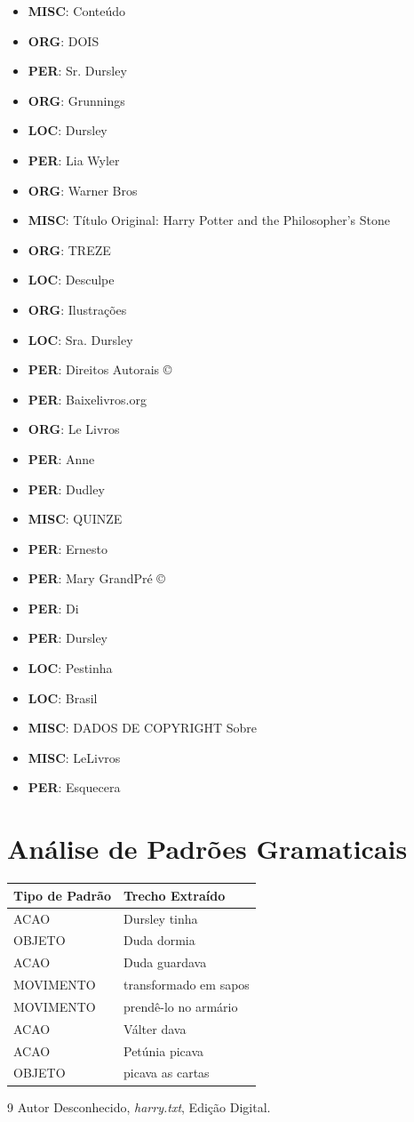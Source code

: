 \documentclass{article}
\begin{document}
\begin{itemize}
\item \textbf{MISC}: Conteúdo
\item \textbf{ORG}: DOIS
\item \textbf{PER}: Sr. Dursley
\item \textbf{ORG}: Grunnings
\item \textbf{LOC}: Dursley
\item \textbf{PER}: Lia Wyler 
\item \textbf{ORG}: Warner Bros
\item \textbf{MISC}: Título Original: Harry Potter and the Philosopher’s Stone 
\item \textbf{ORG}: TREZE
\item \textbf{LOC}: Desculpe
\item \textbf{ORG}: Ilustrações
\item \textbf{LOC}: Sra. Dursley
\item \textbf{PER}: Direitos Autorais ©
\item \textbf{PER}: Baixelivros.org
\item \textbf{ORG}: Le Livros
\item \textbf{PER}: Anne
\item \textbf{PER}: Dudley
\item \textbf{MISC}: QUINZE
\item \textbf{PER}: Ernesto
\item \textbf{PER}: Mary GrandPré ©
\item \textbf{PER}: Di
\item \textbf{PER}: Dursley
\item \textbf{LOC}: Pestinha
\item \textbf{LOC}: Brasil
\item \textbf{MISC}: DADOS DE COPYRIGHT Sobre
\item \textbf{MISC}: LeLivros
\item \textbf{PER}: Esquecera
\end{itemize}
\clearpage

\section{Análise de Padrões Gramaticais}
\begin{table}[h]
\centering
\begin{tabular}{|l|p{8cm}|}
\hline
\textbf{Tipo de Padrão} & \textbf{Trecho Extraído} \\ \hline
ACAO & Dursley tinha \\ \hline
OBJETO & Duda dormia \\ \hline
ACAO & Duda guardava \\ \hline
MOVIMENTO & transformado em sapos \\ \hline
MOVIMENTO & prendê-lo no armário \\ \hline
ACAO & Válter dava \\ \hline
ACAO & Petúnia picava \\ \hline
OBJETO & picava as cartas \\ \hline

\end{tabular}
\end{table}

\clearpage

\begin{thebibliography}{9}
 Autor Desconhecido, \textit{harry.txt}, Edição Digital.
\end{thebibliography}
\end{document}
